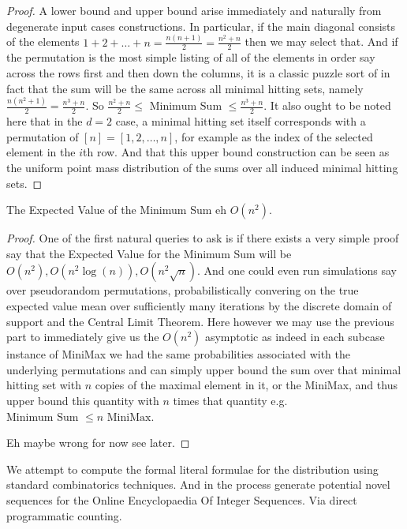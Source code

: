 \documentclass[12pt]{article}
\begin{document}
\begin{proof}
	A lower bound and upper bound arise immediately and naturally from degenerate input cases constructions. In particular, if the main diagonal consists of the elements $1+2+\dots+n = \frac{n(n+1)}{2} = \frac{n^2+n}{2}$ then we may select that. And if the permutation is the most simple listing of all of the elements in order say across the rows first and then down the columns, it is a classic puzzle sort of in fact that the sum will be the same across all minimal hitting sets, namely $\frac{n(n^2+1)}{2} = \frac{n^3+n}{2}$. So $\frac{n^2+n}{2} \le \text{ Minimum Sum } \le \frac{n^3+n}{2}$. It also ought to be noted here that in the $d = 2$ case, a minimal hitting set itself corresponds with a permutation of $[n] = [1,2,\dots,n]$, for example as the index of the selected element in the $i$th row. And that this upper bound construction can be seen as the uniform point mass distribution of the sums over all induced minimal hitting sets.
\end{proof}

\begin{theorem}\label{Thm:$d = 2$ Minimum Sum Expected Value And Sum}
	The Expected Value of the Minimum Sum eh $O(n^2)$.
\end{theorem}

\begin{proof}
	One of the first natural queries to ask is if there exists a very simple proof say that the Expected Value for the Minimum Sum will be $O(n^2), O(n^2 \log(n)), O(n^2 \sqrt{n})$. And one could even run simulations say over pseudorandom permutations, probabilistically convering on the true expected value mean over sufficiently many iterations by the discrete domain of support and the Central Limit Theorem. Here however we may use the previous part to immediately give us the $O(n^2)$ asymptotic as indeed in each subcase instance of MiniMax we had the same probabilities associated with the underlying permutations and can simply upper bound the sum over that minimal hitting set with $n$ copies of the maximal element in it, or the MiniMax, and thus upper bound this quantity with $n$ times that quantity e.g. $\text{Minimum Sum } \le n \text{ MiniMax}$.

	Eh maybe wrong for now see later.
\end{proof}

\begin{theorem}\label{Thm:$d = 2$ Minimum Sum Distribution}
	We attempt to compute the formal literal formulae for the distribution using standard combinatorics techniques. And in the process generate potential novel sequences for the Online Encyclopaedia Of Integer Sequences. Via direct programmatic counting.
\end{theorem}
\end{document}
